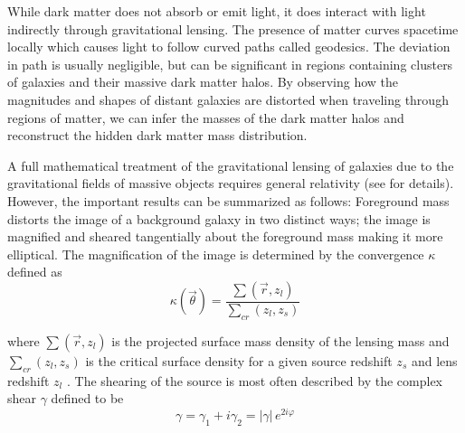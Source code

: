 \documentclass[%
 reprint,
 amsmath,amssymb,
 aps,nofootinbib
]{revtex4-1}
\begin{document}
While dark matter does not absorb or emit light, it does interact with light indirectly through gravitational lensing. The presence of matter curves spacetime locally which causes light to follow curved paths called geodesics. The deviation in path is usually negligible, but can be significant in regions containing clusters of galaxies and their massive dark matter halos. By observing how the magnitudes and shapes of distant galaxies are distorted when traveling through regions of matter, we can infer the masses of the dark matter halos and reconstruct the hidden dark matter mass distribution. %


A full mathematical treatment of the gravitational lensing of galaxies due to the gravitational fields of massive objects requires general relativity (see \cite{modern_cosmology} for details). However, the important results can be summarized as follows: Foreground mass distorts the image of a background galaxy in two distinct ways; the image is magnified and sheared tangentially about the foreground mass making it more elliptical. The magnification of the image is determined by the convergence $\kappa$ defined as
\begin{equation}\label{convergence}
\kappa(\vec{\theta})=\frac{\sum(\vec{r},z_l)}{\sum_{cr}(z_l,z_s)}
\end{equation}

\noindent where $\sum(\vec{r},z_l)$ is the projected surface mass density of the lensing mass and $\sum_{cr}(z_l,z_s)$ is the critical surface density for a given source redshift $z_s$ and lens redshift $z_l$ \cite{schneider}. The shearing of the source is most often described by the complex shear $\gamma$ defined to be
\begin{equation}\label{complex_shear}
\gamma=\gamma_1+i\gamma_2=|\gamma|\,e^{2i\varphi}
\end{equation}
\end{document}
